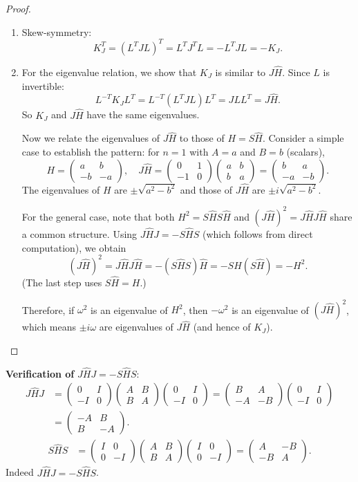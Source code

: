 \documentclass[11pt]{article}
\newcommand{\bmat}[1]{\begin{pmatrix}#1\end{pmatrix}}
\newcommand{\Hhat}{\widehat{H}}
\begin{document}
\begin{proof}\leavevmode
  \begin{enumerate}
    \item Skew-symmetry:
      \[
        K_J^T = (L^T J L)^T = L^T J^T L = -L^T J L = -K_J.
      \]

    \item For the eigenvalue relation, we show that $K_J$ is similar
      to $J\Hhat$.  Since $L$ is invertible:
      \[
        L^{-T} K_J L^T = L^{-T}(L^T J L) L^T = J L L^T = J \Hhat.
      \]
      So $K_J$ and $J\Hhat$ have the same eigenvalues.

      Now we relate the eigenvalues of $J\Hhat$ to those of $H = S\Hhat$.
      Consider a simple case to establish the pattern: for $n = 1$
      with $A = a$ and $B = b$ (scalars),
      \[
        H = \bmat{a & b \\ -b & -a}, \quad
        J\Hhat = \bmat{0 & 1 \\ -1 & 0}\bmat{a & b \\ b & a}
        = \bmat{b & a \\ -a & -b}.
      \]
      The eigenvalues of $H$ are $\pm\sqrt{a^2 - b^2}$ and those of
      $J\Hhat$ are $\pm i\sqrt{a^2 - b^2}$.

      For the general case, note that both $H^2 = S\Hhat S\Hhat$ and
      $(J\Hhat)^2 = J\Hhat J\Hhat$ share a common structure.  Using
      $J\Hhat J = -S\Hhat S$ (which follows from direct computation),
      we obtain
      \[
        (J\Hhat)^2 = J \Hhat J \Hhat = -(S\Hhat S)\Hhat = -S\Hhat(S\Hhat) = -H^2.
      \]
      (The last step uses $S\Hhat = H$.)

      Therefore, if $\omega^2$ is an eigenvalue of $H^2$, then
      $-\omega^2$ is an eigenvalue of $(J\Hhat)^2$, which means
      $\pm i\omega$ are eigenvalues of $J\Hhat$ (and hence of $K_J$).
      \qedhere
  \end{enumerate}
\end{proof}

\medskip

\noindent\textbf{Verification of} $J\Hhat J = -S\Hhat S$:
\begin{align*}
  J\Hhat J
  &= \bmat{0 & I \\ -I & 0}\bmat{A & B \\ B & A}\bmat{0 & I \\ -I & 0}
  = \bmat{B & A \\ -A & -B}\bmat{0 & I \\ -I & 0} \\
  &= \bmat{-A & B \\ B & -A}.
\end{align*}
\begin{align*}
  S\Hhat S
  &= \bmat{I & 0 \\ 0 & -I}\bmat{A & B \\ B & A}\bmat{I & 0 \\ 0 & -I}
  = \bmat{A & -B \\ -B & A}.
\end{align*}
Indeed $J\Hhat J = -S\Hhat S$. \checkmark
\end{document}
